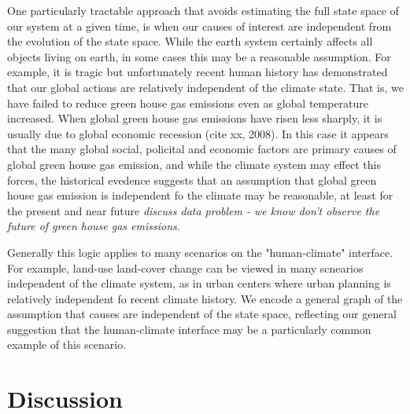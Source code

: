 \documentclass[12pt]{article}
\begin{document}
One particularly tractable approach that avoids estimating the full
state space of our system at a given time, is when our causes of
interest are independent from the evolution of the state space. While
the earth system certainly affects all objects living on earth, in
some cases this may be a reasonable assumption. For example, it is
tragic but unfortunately recent human history has demonstrated that
our global actions are relatively independent of the climate
state. That is, we have failed to reduce green house gas emissions
even as global temperature increased. When global green house gas
emissions have risen less sharply, it is usually due to global
economic recession (cite xx, 2008). In this case it appears that the
many global social, policital and economic factors are primary causes
of global green house gas emission, and while the climate system may
effect this forces, the historical evedence suggests that an
assumption that global green house gas emission is independent fo the
climate may be reasonable, at least for the present and near future
\emph{discuss data problem - we know don't observe the future of green
  house gas emissions}.

Generally this logic applies to many scenarios on the
"human-climate" interface. For example, land-use land-cover change
can be viewed in many scnearios independent of the climate system,
as in urban centers where urban planning is relatively independent
fo recent climate history. We encode a general graph of the
assumption that causes are independent of the state space,
reflecting our general suggestion that the human-climate interface
may be a particularly common example of this scenario.

\section{Discussion}
\end{document}
